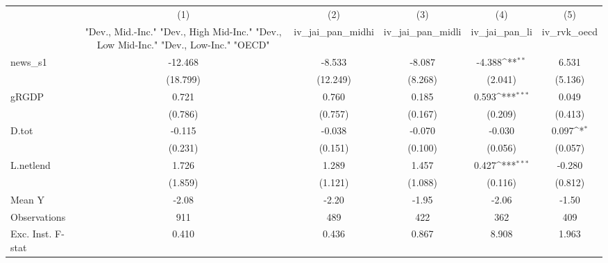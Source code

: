 {
\def\sym#1{\ifmmode^{#1}\else\(^{#1}\)\fi}
\begin{tabular}{l*{5}{c}}
\toprule
            &\multicolumn{1}{c}{(1)}&\multicolumn{1}{c}{(2)}&\multicolumn{1}{c}{(3)}&\multicolumn{1}{c}{(4)}&\multicolumn{1}{c}{(5)}\\
            &\multicolumn{1}{c}{ "Dev., Mid.-Inc." "Dev., High Mid-Inc." "Dev., Low Mid-Inc." "Dev., Low-Inc." "OECD" }&\multicolumn{1}{c}{iv\_jai\_pan\_midhi}&\multicolumn{1}{c}{iv\_jai\_pan\_midli}&\multicolumn{1}{c}{iv\_jai\_pan\_li}&\multicolumn{1}{c}{iv\_rvk\_oecd}\\
\midrule
news\_s1     &     -12.468         &      -8.533         &      -8.087         &      -4.388\sym{**} &       6.531         \\
            &    (18.799)         &    (12.249)         &     (8.268)         &     (2.041)         &     (5.136)         \\
\addlinespace
gRGDP       &       0.721         &       0.760         &       0.185         &       0.593\sym{***}&       0.049         \\
            &     (0.786)         &     (0.757)         &     (0.167)         &     (0.209)         &     (0.413)         \\
\addlinespace
D.tot       &      -0.115         &      -0.038         &      -0.070         &      -0.030         &       0.097\sym{*}  \\
            &     (0.231)         &     (0.151)         &     (0.100)         &     (0.056)         &     (0.057)         \\
\addlinespace
L.netlend   &       1.726         &       1.289         &       1.457         &       0.427\sym{***}&      -0.280         \\
            &     (1.859)         &     (1.121)         &     (1.088)         &     (0.116)         &     (0.812)         \\
\midrule
Mean Y      &       -2.08         &       -2.20         &       -1.95         &       -2.06         &       -1.50         \\
Observations&         911         &         489         &         422         &         362         &         409         \\
Exc. Inst. F-stat&       0.410         &       0.436         &       0.867         &       8.908         &       1.963         \\
\bottomrule
\end{tabular}
}
